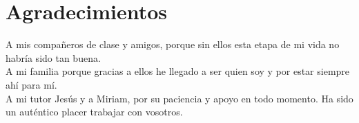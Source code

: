 

\chapter{Agradecimientos}

A mis compañeros de clase y amigos, porque sin ellos esta etapa de mi vida no habría sido tan buena.\\

A mi familia porque gracias a ellos he llegado a ser quien soy y por estar siempre ahí para mí.\\

A mi tutor Jesús y a Miriam, por su paciencia y apoyo en todo momento. Ha sido un auténtico placer trabajar con vosotros.

\cleardoublepage
\endinput
